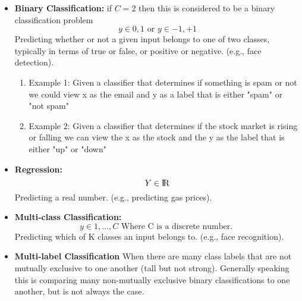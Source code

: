 \documentclass{article}
\begin{document}
    \begin{itemize}
        \item 
            \textbf{Binary Classification:} 
            if $C=2$ then this is considered to be a binary classification problem
            \begin{equation}
                {y \in {0, 1}} \text{ or } {y \in {-1, +1}}
            \end{equation}
            Predicting whether or not a given input belongs to one of two classes, typically in terms of true or false, or positive or negative. (e.g., face detection). 
            
                \begin{enumerate}
                    \item Example 1: 
                        Given a classifier that determines if something is spam or not we could view x as the email and y as a label that is either "spam" or "not spam"
            
                    \item Example 2:
                        Given a classifier that determines if the stock market is rising or falling we can view the x as the stock and the y as the label that is either "up" or "down"
                \end{enumerate}
            
        \item
             \textbf{Regression:} 
            \begin{equation}
                {Y \in \rm I\!R}
            \end{equation}
            Predicting a real number. (e.g., predicting gas prices).
            
        \item
             \textbf{Multi-class Classification:} 
            \begin{equation}
                {y \in {1, ..., C}} \text{ Where C is a discrete number. }
            \end{equation}
            Predicting which of {K} classes an input belongs to. (e.g., face recognition). 
            
        \item 
            \textbf{Multi-label Classification}
            When there are many class labels that are not mutually exclusive to one another (tall but not strong). Generally speaking this is comparing many non-mutually exclusive binary classifications to one another, but is not always the case. 
    \end{itemize}
    
\end{document}

